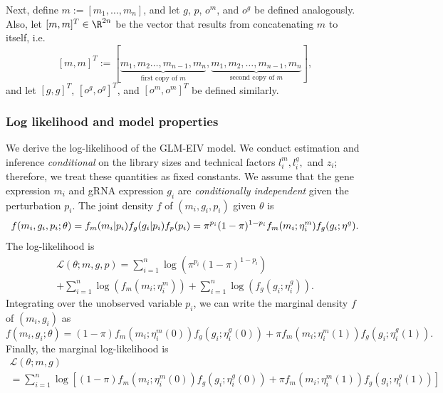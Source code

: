 \documentclass[12pt]{article}
\begin{document}
Next, define $m := [m_1, \dots, m_n]$, and let $g$, $p$, $o^m$, and $o^g$ be defined analogously. Also, let $[m,m]^T \in \R^{2n}$ be the vector that results from concatenating $m$ to itself, i.e.
$$ [m,m]^T := [\underbrace{m_1, m_2 \dots, m_{n-1}, m_n}_\textrm{first copy of $m$}, \underbrace{m_1, m_2, \dots, m_{n-1}, m_n}_\textrm{second copy of $m$}],$$ and let $[g,g]^T$, $[o^g,o^g]^T$, and $[o^m,o^m]^T$ be defined similarly. 

\subsubsection*{Log likelihood and model properties}
We derive the log-likelihood of the GLM-EIV model. We conduct estimation and inference \textit{conditional} on the library sizes and technical factors $l^m_i, l^g_i,$ and $z_i$; therefore, we treat these quantities as fixed constants. We assume that the gene expression $m_i$ and gRNA expression $g_i$ are \textit{conditionally independent} given the perturbation $p_i$. The joint density $f$ of $(m_i, g_i, p_i)$ given $\theta$ is
\begin{equation}\label{full_density}
f(m_i,g_i,p_i; \theta) = f_m(m_i | p_i) f_g(g_i | p_i) f_p(p_i) \\ = \pi^{p_i}(1-\pi)^{1-p_i} f_m(m_i; \eta^m_i) f_g(g_i; \eta^g).
\end{equation}
The log-likelihood is
\begin{multline}\label{full_log_lik}
\mathcal{L}(\theta; m, g, p) = \sum_{i=1}^n \log\left( \pi^{p_i}(1-\pi)^{1-p_i} \right) \\ + \sum_{i=1}^n \log\left( f_m(m_i; \eta^m_i)\right) + \sum_{i=1}^n \log\left( f_g(g_i; \eta_i^g) \right). \end{multline}
Integrating over the unobserved variable $p_i$, we can write the marginal density $f$ of $(m_i, g_i)$ as
\begin{equation}\label{marginal_density}
f(m_i, g_i; \theta) = (1-\pi) f_m(m_i; \eta^m_i(0)) f_g(g_i; \eta^g_i(0)) + \pi f_m(m_i; \eta^m_i(1)) f_g(g_i; \eta^g_i(1)).
\end{equation}
Finally, the marginal log-likelihood is
\begin{multline}\label{marginal_log_lik}
\mathcal{L}(\theta; m, g) \\ = \sum_{i=1}^n \log\left[(1-\pi) f_m(m_i; \eta^m_i(0)) f_g(g_i; \eta^g_i(0)) + \pi f_m(m_i; \eta^m_i(1)) f_g(g_i; \eta^g_i(1)) \right]
\end{multline}
\end{document}
